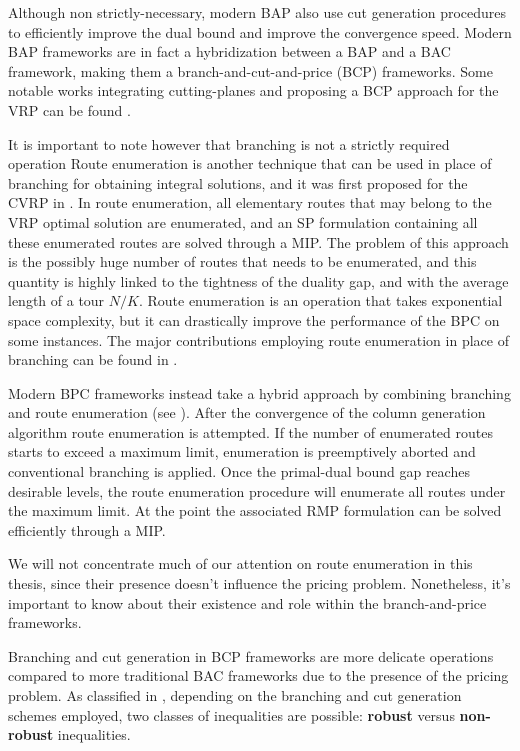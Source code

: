 Although non strictly-necessary, modern BAP also use
cut generation procedures to efficiently improve the dual bound and improve the convergence speed.
Modern BAP frameworks
are in fact a hybridization between a BAP and a BAC framework,
making them a branch-and-cut-and-price (BCP) frameworks.
Some notable works integrating cutting-planes and proposing
a BCP approach for the VRP can be found \textcite{fukasawa2006, ropke2012}.

\medskip

It is important to note however that branching is not a strictly required operation
Route enumeration is another technique that can be used in place of branching
for obtaining integral solutions, and it was first proposed for the CVRP in \textcite{baldacci2008}.
In route enumeration, all elementary routes that may belong to the VRP optimal solution are enumerated,
and an SP formulation containing all these enumerated routes are solved through a MIP.
The problem of this approach is the possibly huge number of routes that needs to be enumerated,
and this quantity is highly linked to the tightness of the duality gap,
and with the average length of a tour $N / K$.
Route enumeration is an operation that takes exponential space complexity,
but it can drastically improve the performance of the BPC on some instances.
The major contributions employing route enumeration in place of branching can be found in
\textcite{baldacci2008, baldacci2011, contardo2014}.

Modern BPC frameworks instead take a hybrid approach by combining branching and route enumeration
(see \cite{pessoa2008, pessoa2009, pecin2017, pessoa2020}).
After the convergence of the column generation algorithm route enumeration is attempted.
If the number of enumerated routes starts to exceed a maximum limit, enumeration
is preemptively aborted and conventional branching is applied.
Once the primal-dual bound gap reaches desirable levels, the route enumeration
procedure will enumerate all routes under the maximum limit.
At the point the associated RMP formulation can be solved efficiently through a MIP.

We will not concentrate much of our attention on route enumeration in this
thesis, since their presence doesn't influence the pricing problem.
Nonetheless, it's important to know about their existence and role within
the branch-and-price frameworks.

\medskip

Branching and cut generation in BCP frameworks are more delicate operations
compared to more traditional BAC frameworks due to the presence of the pricing problem.
As classified in \textcite{dearagao2003},
depending on the branching and cut generation schemes employed,
two classes of inequalities are possible:
\textbf{robust} versus \textbf{non-robust} inequalities.

